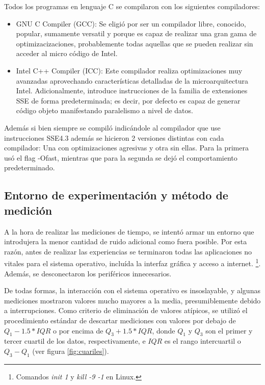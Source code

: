Todos los programas en lenguaje C se compilaron con los siguientes compiladores:

\begin{itemize}
	\item GNU C Compiler (GCC): Se eligió por ser un compilador libre, conocido, popular, sumamente versatil y porque es capaz de realizar una gran gama de optimizacizaciones, probablemente todas aquellas que se pueden realizar sin acceder al micro código de Intel.

	\item Intel C++ Compiler (ICC): Este compilador realiza optimizaciones muy avanzadas aprovechando características detalladas de la microarquitectura Intel. Adicionalmente, introduce instrucciones de la familia de extensiones SSE de forma predeterminada; es decir, por defecto es capaz de generar código objeto manifestando paralelismo a nivel de datos.
\end{itemize} 
				
Además si bien siempre se compiló indicándole al compilador que use instrucciones SSE4.3 además se hicieron 2 versiones distintas con cada compilador: Una con optimizaciones agresivas y otra sin ellas. Para la primera usó el flag -Ofast, mientras que para la segunda se dejó el comportamiento predeterminado.


\subsection{Entorno de experimentación y método de medición}

A la hora de realizar las mediciones de tiempo, se intentó armar un entorno que introdujera la menor cantidad de ruido adicional como fuera posible. Por esta razón, antes de realizar las experiencias se terminaron todas las aplicaciones no vitales para el sistema operativo, incluída la interfaz gráfica y acceso a internet. \footnote{Comandos \emph{init 1} y \emph{kill -9 -1} en Linux.}. Además, se desconectaron los periféricos
innecesarios.

De todas formas, la interacción con el sistema operativo es insoslayable, y algunas mediciones mostraron valores mucho mayores a la media, presumiblemente debido a interrupciones. Como criterio de eliminación de valores atípicos, se utilizó el procedimiento estándar de descartar mediciones con valores por debajo de $Q_1 - 1.5 * IQR$ o por encima de $Q_3 + 1.5 * IQR$, donde $Q_1$ y $Q_3$ son el primer y tercer cuartil de los datos, respectivamente, e $IQR$ es el rango intercuartil o $Q_3 - Q_1$ (ver figura \ref{fig:cuariles}).

